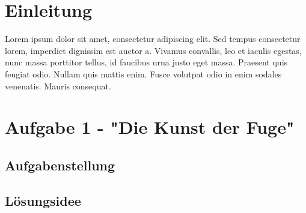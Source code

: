 \documentclass[a4paper,12pt]{article}			%
\begin{document}

\newpage 								%

\thispagestyle{empty}
\tableofcontents 						%


\setcounter{page}{1}					%


\newpage
\section{Einleitung}



Lorem ipsum dolor sit amet, consectetur adipiscing elit. Sed tempus consectetur lorem, imperdiet dignissim est auctor a. Vivamus convallis, leo et iaculis egestas, nunc massa porttitor tellus, id faucibus urna justo eget massa. Praesent quis feugiat odio. Nullam quis mattis enim. Fusce volutpat odio in enim sodales venenatis. Mauris consequat.


\newpage
\section{Aufgabe 1 - "Die Kunst der Fuge"}



\subsection{Aufgabenstellung}

\subsection{Lösungsidee}
\end{document}
